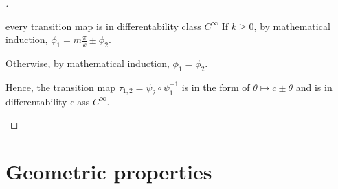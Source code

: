 \documentclass[stu, babel, american, biblatex, a4paper, leqno, draftall]{apa7}
\begin{document}
\begin{proof}[]
\begin{subproof}{every transition map is in differentability class $C^\infty$}
        If $k\ge 0$, by mathematical induction, $\phi_1 = m\frac{\pi}{k}\pm\phi_2$.

        Otherwise, by mathematical induction, $\phi_1 = \phi_2$.

        Hence, the transition map $\tau_{1,2} = \psi_2 \circ \psi_1^{-1}$
        is in the form of $\theta \mapsto c\pm\theta$
        and is in differentability class $C^\infty$.
    \end{subproof}
\end{proof}
\section{Geometric properties}
\end{document}
